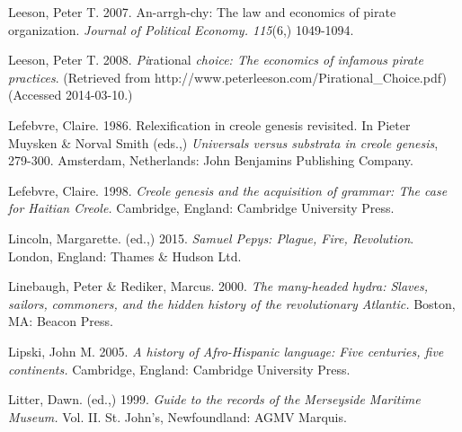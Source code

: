 \begin{styleStandard}
Leeson, Peter T. 2007. An-arrgh-chy: The law and economics of pirate organization. \textit{Journal of Political Economy. 115}(6,) 1049-1094.
\end{styleStandard}


\begin{styleStandard}
Leeson, Peter T. 2008. \textit{Pi}rational\textit{ choice: The economics of infamous pirate practices}. (Retrieved from http://www.peterleeson.com/Pirational\_Choice.pdf) (Accessed 2014-03-10.)
\end{styleStandard}


\begin{styleStandard}
Lefebvre, Claire. 1986. Relexification in creole genesis revisited. In Pieter Muysken \& Norval Smith (eds.,) \textit{Universals versus substrata in creole genesis}, 279-300. Amsterdam, Netherlands: John Benjamins Publishing Company.
\end{styleStandard}


\begin{styleStandard}
Lefebvre, Claire. 1998. \textit{Creole genesis and the acquisition of grammar: The case for Haitian Creole. }Cambridge, England: Cambridge University Press.
\end{styleStandard}


\begin{styleStandard}
Lincoln, Margarette. (ed.,) 2015. \textit{Samuel Pepys: Plague, Fire, Revolution}. London, England: Thames \& Hudson Ltd. 
\end{styleStandard}


\begin{styleStandard}
Linebaugh, Peter \& Rediker, Marcus. 2000. \textit{The many-headed hydra: Slaves, sailors,} \textit{commoners, and the hidden history of the revolutionary Atlantic.} Boston, MA: Beacon Press.
\end{styleStandard}


\begin{styleStandard}
Lipski, John M. 2005. \textit{A history of Afro-Hispanic language: Five centuries, five continents.} Cambridge, England: Cambridge University Press.
\end{styleStandard}


\begin{styleStandard}
Litter, Dawn. (ed.,) 1999. \textit{Guide to the records of the Merseyside Maritime Museum. }Vol. II. St. John’s, Newfoundland: AGMV Marquis. 
\end{styleStandard}


